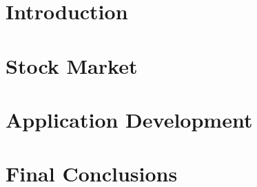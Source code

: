 \documentclass[a4paper, 12pt]{report}
\begin{document}





\tableofcontents

\listoftables
\listoffigures
\listofalgorithms


\chapter{Introduction}


\chapter{Stock Market}


\chapter{Application Development}


\chapter{Final Conclusions}




\printbibliography[heading=bibintoc, title={Bibliography}]
\end{document}
